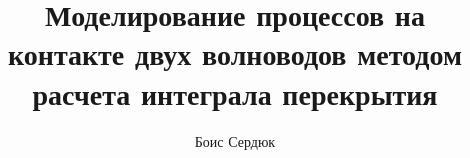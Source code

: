\thispagestyle{empty}			

\title{Моделирование процессов на контакте двух волноводов методом расчета интеграла перекрытия}
\author{Боис Сердюк}
\maketitle

\newpage
